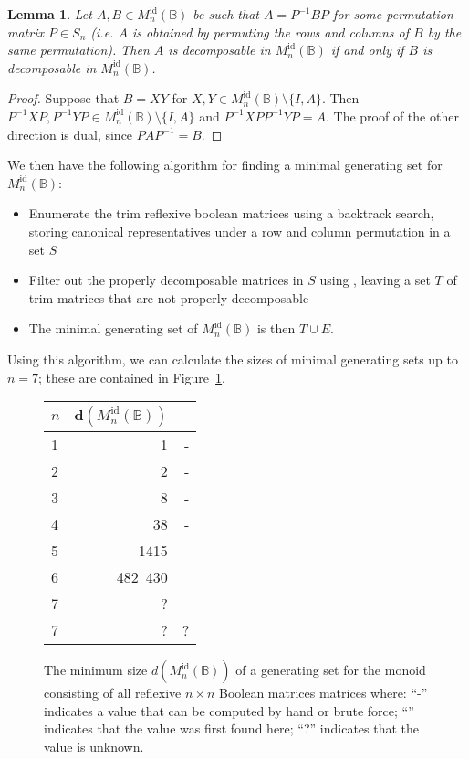 \documentclass[11pt]{article}
\newtheorem{lemma}[thm]{Lemma}
\numberwithin{equation}{section}
\newcommand{\B}{\mathbb{B}}
\newcommand{\Refn}{M_n^{\text{id}}(\B)}
\newcommand{\cmark}{\ding{51}}
\begin{document}
\begin{lemma}
  Let $A, B \in \Refn$ be such that $A = P^{-1} B P$ for some permutation matrix
  $P \in S_n$ (i.e. $A$ is obtained by permuting the rows and columns of $B$ by
  the same permutation). Then $A$ is decomposable in $\Refn$ if and only if $B$
  is decomposable in $\Refn$.
\end{lemma}
\begin{proof}
  Suppose that $B = XY$ for $X, Y \in \Refn\setminus \{I, A\}$. Then $P^{-1}XP,
  P^{-1}YP \in \Refn\setminus\{I, A\}$ and $P^{-1}XPP^{-1}YP = A$. The proof of
  the other direction is dual, since $PAP^{-1} = B$.
\end{proof}

We then have the following algorithm for finding a minimal generating set for
$\Refn$:
\begin{itemize}
  \item
    Enumerate the trim reflexive boolean matrices using a backtrack search,
    storing canonical representatives under a row and column permutation in a
    set $S$
  \item 
    Filter out the properly decomposable matrices in $S$ using
    , leaving a set $T$ of trim matrices that
    are not properly decomposable
  \item
    The minimal generating set of $\Refn$ is then $T \cup E$.
\end{itemize}
Using this algorithm, we can calculate the sizes of minimal generating sets up
to $n = 7$; these are contained in Figure~\ref{fig:reflexiverank}.

\begin{figure}
  \centering
  \begin{tabular}{l|r|r}
    $n$ & $\mathbf{d}(\Refn)$ &   \\
    \hline
    1 & 1          & - \\ 
    2 & 2          & - \\ 
    3 & 8          & - \\ 
    4 & 38         & - \\
    5 & 1415       & \cmark \\
    6 & 482\ 430   & \cmark \\ 
    7 & ?          & \cmark \\
    7 & ?          & ? \\
  \end{tabular}
  \caption{The minimum size $d(\Refn)$ of a generating set for the monoid
    consisting of all reflexive $n \times n$ Boolean matrices matrices where:
    ``-'' indicates a value that can be computed by hand or brute force;
    ``\cmark'' indicates that the value was first found here; ``?'' indicates
    that the value is unknown.}
  \label{fig:reflexiverank}
\end{figure}
\end{document}
